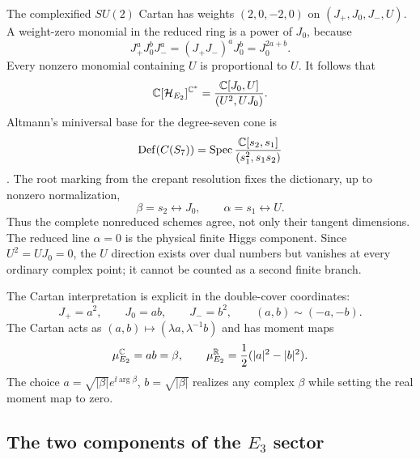 The complexified $SU(2)$ Cartan has weights $(2,0,-2,0)$ on
$(J_+,J_0,J_-,U)$. A weight-zero monomial in the reduced ring is a power
of $J_0$, because
\begin{equation}
 J_+^aJ_0^bJ_-^a=(J_+J_-)^aJ_0^b=J_0^{2a+b}.
\end{equation}
Every nonzero monomial containing $U$ is proportional to $U$. It follows that
\begin{equation}
 \mathbb C[\mathcal H_{E_2}]^{\mathbb C^*}
 =\frac{\mathbb C[J_0,U]}{(U^2,UJ_0)}.
 \label{eq:e2-invariants}
\end{equation}
Altmann's miniversal base for the degree-seven cone is
\begin{equation}
 \operatorname{Def}(C(S_7))
 =\operatorname{Spec}\frac{\mathbb C[s_2,s_1]}{(s_1^2,s_1s_2)}
 \label{eq:e2-altmann}
\end{equation}
\cite{Altmann:1997}. The root marking from the crepant resolution fixes the
dictionary, up to nonzero normalization,
\begin{equation}
 \beta=s_2\longleftrightarrow J_0,
 \qquad
 \alpha=s_1\longleftrightarrow U.
 \label{eq:e2-dictionary}
\end{equation}
Thus the complete nonreduced schemes agree, not only their tangent dimensions.
The reduced line $\alpha=0$ is the physical finite Higgs component. Since
$U^2=UJ_0=0$, the $U$ direction exists over dual numbers but vanishes at every
ordinary complex point; it cannot be counted as a second finite branch.

The Cartan interpretation is explicit in the double-cover coordinates:
\begin{equation}
 J_+=a^2,
 \qquad J_0=ab,
 \qquad J_-=b^2,
 \qquad (a,b)\sim(-a,-b).
 \label{eq:e2-double-cover}
\end{equation}
The Cartan acts as $(a,b)\mapsto(\lambda a,\lambda^{-1}b)$ and has moment
maps
\begin{equation}
 \mu_{E_2}^{\mathbb C}=ab=\beta,
 \qquad
 \mu_{E_2}^{\mathbb R}=\frac12(|a|^2-|b|^2).
 \label{eq:e2-moment-maps}
\end{equation}
The choice $a=\sqrt{|\beta|}e^{\ii\arg\beta}$,
$b=\sqrt{|\beta|}$ realizes any complex $\beta$ while setting the real
moment map to zero.

\subsection[The two components of the E3 sector]{The two components of the $E_3$ sector}
\label{subsec:e3-sector}

